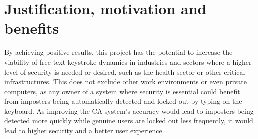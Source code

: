 \documentclass[informationsecurity]{gucmasterproject}
\begin{document}



%

\section{Justification, motivation and benefits}

By achieving positive results, this project has the potential to increase the viability of free-text keystroke dynamics in industries and sectors where a higher level of security is needed or desired, such as the health sector or other critical infrastructures.
This does not exclude other work environments or even private computers, as any owner of a system where security is essential could benefit from imposters being automatically detected and locked out by typing on the keyboard.
As improving the CA system's accuracy would lead to imposters being detected more quickly while genuine users are locked out less frequently, it would lead to higher security and a better user experience.
\end{document}
